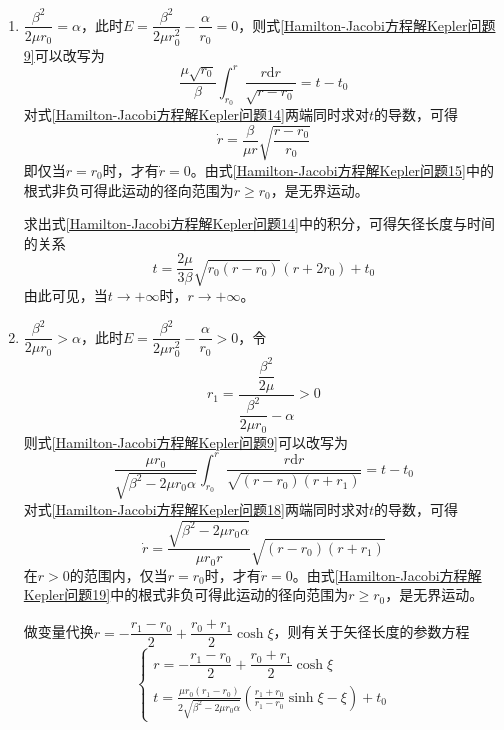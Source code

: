 \begin{enumerate}
\item $\dfrac{\beta^2}{2\mu r_0}=\alpha$，此时$E = \dfrac{\beta^2}{2\mu r_0^2}-\dfrac{\alpha}{r_0}=0$，则式\eqref{Hamilton-Jacobi方程解Kepler问题9}可以改写为
\begin{equation}
	\frac{\mu\sqrt{r_0}}{\beta} \int_{r_0}^r \frac{r\mathrm{d}r}{\sqrt{r-r_0}} = t-t_0
	\label{Hamilton-Jacobi方程解Kepler问题14}
\end{equation}
对式\eqref{Hamilton-Jacobi方程解Kepler问题14}两端同时求对$t$的导数，可得
\begin{equation}
	\dot{r} = \frac{\beta}{\mu r}\sqrt{\frac{r-r_0}{r_0}}
	\label{Hamilton-Jacobi方程解Kepler问题15}
\end{equation}
即仅当$r=r_0$时，才有$\dot{r} = 0$。由式\eqref{Hamilton-Jacobi方程解Kepler问题15}中的根式非负可得此运动的径向范围为$r\geqslant r_0$，是无界运动。

求出式\eqref{Hamilton-Jacobi方程解Kepler问题14}中的积分，可得矢径长度与时间的关系
\begin{equation}
	t = \frac{2\mu}{3\beta}\sqrt{r_0(r-r_0)}(r+2r_0) + t_0
	\label{Hamilton-Jacobi方程解Kepler问题16}
\end{equation}
由此可见，当$t\to +\infty$时，$r\to +\infty$。

\item $\dfrac{\beta^2}{2\mu r_0}>\alpha$，此时$E = \dfrac{\beta^2}{2\mu r_0^2}-\dfrac{\alpha}{r_0}>0$，令
\begin{equation}
	r_1 = \dfrac{\dfrac{\beta^2}{2\mu}}{\dfrac{\beta^2}{2\mu r_0}-\alpha} > 0
	\label{Hamilton-Jacobi方程解Kepler问题17}
\end{equation}
则式\eqref{Hamilton-Jacobi方程解Kepler问题9}可以改写为
\begin{equation}
	\frac{\mu r_0}{\sqrt{\beta^2-2\mu r_0\alpha}} \int_{r_0}^r \frac{r\mathrm{d}r}{\sqrt{(r-r_0)(r+r_1)}} = t-t_0
	\label{Hamilton-Jacobi方程解Kepler问题18}
\end{equation}
对式\eqref{Hamilton-Jacobi方程解Kepler问题18}两端同时求对$t$的导数，可得
\begin{equation}
	\dot{r} = \frac{\sqrt{\beta^2-2\mu r_0\alpha}}{\mu r_0r} \sqrt{(r-r_0)(r+r_1)}
	\label{Hamilton-Jacobi方程解Kepler问题19}
\end{equation}
在$r>0$的范围内，仅当$r=r_0$时，才有$\dot{r}=0$。由式\eqref{Hamilton-Jacobi方程解Kepler问题19}中的根式非负可得此运动的径向范围为$r\geqslant r_0$，是无界运动。

做变量代换$r=-\dfrac{r_1-r_0}{2}+\dfrac{r_0+r_1}{2}\cosh\xi$，则有关于矢径长度的参数方程
\begin{equation}
\begin{cases}
	\displaystyle r = -\dfrac{r_1-r_0}{2}+\dfrac{r_0+r_1}{2}\cosh\xi \\
	\displaystyle t = \frac{\mu r_0(r_1-r_0)}{2\sqrt{\beta^2-2\mu r_0\alpha}} \left(\frac{r_1+r_0}{r_1-r_0}\sinh \xi-\xi\right) + t_0
\end{cases}
\label{Hamilton-Jacobi方程解Kepler问题20}
\end{equation}
\end{enumerate}

